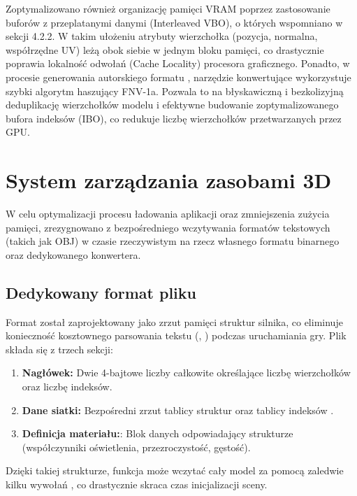          Zoptymalizowano również organizację pamięci VRAM poprzez zastosowanie buforów z przeplatanymi danymi (Interleaved VBO), o których wspomniano w sekcji 4.2.2. W takim ułożeniu atrybuty wierzchołka (pozycja, normalna, współrzędne UV) leżą obok siebie w jednym bloku pamięci, co drastycznie poprawia lokalność odwołań (Cache Locality) procesora graficznego. Ponadto, w procesie generowania autorskiego formatu , narzędzie konwertujące  wykorzystuje szybki algorytm haszujący FNV-1a. Pozwala to na błyskawiczną i bezkolizyjną deduplikację wierzchołków modelu i efektywne budowanie zoptymalizowanego bufora indeksów (IBO), co redukuje liczbę wierzchołków przetwarzanych przez GPU.

    \section{System zarządzania zasobami 3D}
     W celu optymalizacji procesu ładowania aplikacji oraz zmniejszenia zużycia pamięci, zrezygnowano z bezpośredniego wczytywania formatów tekstowych (takich jak OBJ) w czasie rzeczywistym na rzecz własnego formatu binarnego oraz dedykowanego konwertera.

        \subsection{Dedykowany format pliku }
         Format  został zaprojektowany jako zrzut pamięci struktur silnika, co eliminuje konieczność kosztownego parsowania tekstu (, ) podczas uruchamiania gry.
         Plik składa się z trzech sekcji:

         \begin{enumerate}
         \item \textbf{Nagłówek:} Dwie 4-bajtowe liczby całkowite określające liczbę wierzchołków oraz liczbę indeksów.
         \item \textbf{Dane siatki:} Bezpośredni zrzut tablicy struktur  oraz tablicy indeksów .
         \item \textbf{Definicja materiału:}: Blok danych odpowiadający strukturze  (współczynniki oświetlenia, przezroczystość, gęstość).
         \end{enumerate}

         \bigbreak

         Dzięki takiej strukturze, funkcja  może wczytać cały model za pomocą zaledwie kilku wywołań , co drastycznie skraca czas inicjalizacji sceny.

